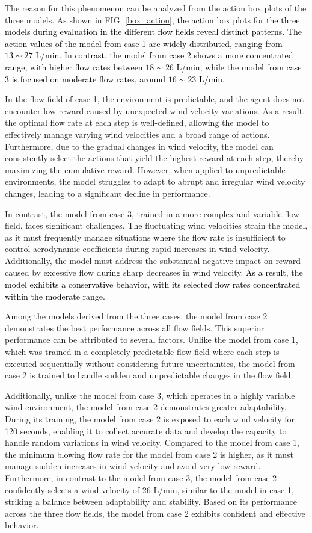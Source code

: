\documentclass[%
 aip,
 amsmath,amssymb,
 reprint,%
]{revtex4-1}
\newcommand{\black}[1]{\textcolor{black}{#1}}
\begin{document}
The reason for this phenomenon can be analyzed from the action box plots of the three models. As shown in FIG. \ref{box_action}, \black{the action box plots for the three models during evaluation in the different flow fields reveal distinct patterns. The action values of the model from case 1 are widely distributed, ranging from $13 \sim 27$ L/min. In contrast, the model from case 2 shows a more concentrated range, with higher flow rates between $18 \sim 26$ L/min, while the model from case 3 is focused on moderate flow rates, around $16 \sim 23$ L/min.}

In the flow field of case 1, the environment is predictable, and the agent does not encounter low reward caused by unexpected wind velocity variations. As a result, the optimal flow rate at each step is well-defined, allowing the model to effectively manage varying wind velocities and a broad range of actions. Furthermore, due to the gradual changes in wind velocity, the model can consistently select the actions that yield the highest reward at each step, thereby maximizing the cumulative reward. However, when applied to unpredictable environments, the model struggles to adapt to abrupt and irregular wind velocity changes, leading to a significant decline in performance.

In contrast, the model from case 3, trained in a more complex and variable flow field, faces significant challenges. The fluctuating wind velocities strain the model, as it must frequently manage situations where the flow rate is insufficient to control aerodynamic coefficients during rapid increases in wind velocity. Additionally, the model must address the substantial negative impact on reward caused by excessive flow during sharp decreases in wind velocity. \black{As a result, the model exhibits a conservative behavior, with its selected flow rates concentrated within the moderate range.}

Among the models derived from the three cases, the model from case 2 demonstrates the best performance across all flow fields. This superior performance can be attributed to several factors. Unlike the model from case 1, which was trained in a completely predictable flow field where each step is executed sequentially without considering future uncertainties, the model from case 2 is trained to handle sudden and unpredictable changes in the flow field. 

Additionally, unlike the model from case 3, which operates in a highly variable wind environment, the model from case 2 demonstrates greater adaptability. During its training, the model from case 2 is exposed to each wind velocity for 120 seconds, enabling it to collect accurate data and develop the capacity to handle random variations in wind velocity. Compared to the model from case 1, the minimum blowing flow rate for the model from case 2 is higher, as it must manage sudden increases in wind velocity and avoid very low reward. Furthermore, in contrast to the model from case 3, the model from case 2 confidently selects a wind velocity of 26 L/min, similar to the model in case 1, striking a balance between adaptability and stability. Based on its performance across the three flow fields, the model from case 2 exhibits confident and effective behavior.
\end{document}
